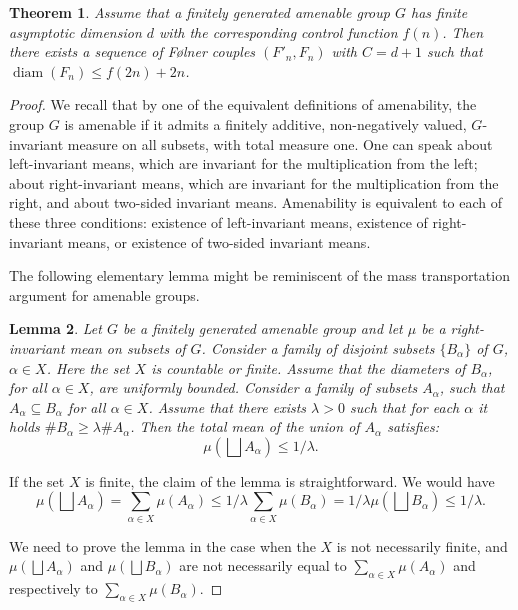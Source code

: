 \documentclass{amsart}
\numberwithin{figure}{section}
\theoremstyle{plain}
\newtheorem{thm}{Theorem}[section]
\newtheorem{lemma}[thm]{Lemma}
\theoremstyle{definition}
\newcommand{\diam}{\operatorname{diam}}
\begin{document}
\begin{thm}\label{pr:dimtoisodiam}
Assume that a finitely generated amenable group $G$ has finite asymptotic dimension $d$ with the corresponding control function
 $f(n)$.
Then there exists a sequence of F{\o}lner couples $(F'_n,F_n)$ with $C = d+1$ such that
$\diam(F_n) \leqslant f(2n)+2n$.
\end{thm}

\begin{proof}

We recall that by one of the equivalent definitions of amenability, the group $G$ is amenable if it admits a finitely additive, non-negatively valued,  $G$-invariant measure on all subsets, with total measure one.
One can speak about left-invariant means, which are invariant for the multiplication from the left;
about right-invariant means, which are invariant for the multiplication from the right, and about two-sided invariant means. 
Amenability is equivalent to each of these three conditions: existence of left-invariant means, existence of right-invariant means, or existence of two-sided invariant means.

The following elementary lemma might be reminiscent of the mass transportation argument for amenable groups.
\begin{lemma}\label{lem:lemma1}
Let $G$ be a finitely generated amenable group and let $\mu$ be a right-invariant mean on subsets of $G$. 
Consider a family of disjoint subsets $\{B_{\alpha}\}$ of $G$, $\alpha \in X$. Here the set $X$ is  countable or finite.
Assume that  
the diameters of  $B_{\alpha}$, for all $\alpha \in X$, are uniformly bounded.
Consider a family of subsets $A_{\alpha}$, such that $A_{\alpha} \subseteq B_{\alpha}$ for all $\alpha \in X$. Assume that there exists $\lambda>0$ such that for each $\alpha $ it holds $\#B_{\alpha} \geqslant \lambda \# A_{\alpha}$.
Then  the total mean of the union of $A_{\alpha}$ satisfies:
$$
\mu (\bigsqcup A_{\alpha}) \leqslant 1/\lambda.
$$


\end{lemma}

If the set $X$ is finite, the claim of the lemma is straightforward.  We would have
$$
\mu (\bigsqcup A_{\alpha}) = \sum_{\alpha \in X} \mu(A_\alpha) \le
1/\lambda \sum_{\alpha \in X} \mu(B_\alpha) = 1/\lambda 
\mu (\bigsqcup B_{\alpha}) \le  1/\lambda.
$$


We need to prove the lemma in the case when the $X$ is not necessarily finite, and 
$\mu (\bigsqcup A_{\alpha})$ and  $\mu (\bigsqcup B_{\alpha})$ are not necessarily equal to $\sum_{\alpha \in X} \mu(A_\alpha)$ and respectively
to $\sum_{\alpha \in X} \mu(B_\alpha)$.



\end{proof}
\end{document}
